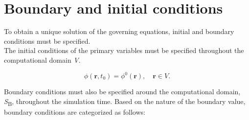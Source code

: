 \section{Boundary and initial conditions}
To obtain a unique solution of the governing equations, initial and boundary conditions must be specified. \\
The initial conditions of the primary variables must be specified throughout the computational domain \textit {V}. 

\begin{equation}\label{eq:initCondition} %
 \phi(\textbf{r},t_0) = \phi^0(\textbf{r}), \quad \textbf{r} \in \textit{V}.
\end{equation}

Boundary conditions must also be specified around the computational domain, \textit{S}\textsubscript{B}, throughout 
the simulation time. Based on the nature of the boundary value, boundary conditions are categorized as follows: 
